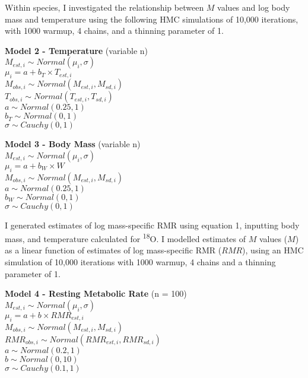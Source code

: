 \documentclass[12pt, titlepage]{article}
\begin{document}
Within species, I investigated the relationship between $M$ values and log body mass and temperature using the following HMC simulations of 10,000 iterations, with 1000 warmup, 4 chains, and a thinning parameter of 1.

\begin{center}
\textbf{Model 2 - Temperature} (variable n)
\\$M_{est, i} \sim Normal(\mu_{i}, \sigma)$
\\$\mu_{i} = a + b_{T} \times T_{est, i}$
\\$M_{obs, i} \sim Normal(M_{est, i}, M_{sd, i})$
\\$T_{obs, i} \sim Normal(T_{est, i}, T_{sd, i})$
\\$a \sim Normal(0.25, 1)$
\\$b_{T} \sim Normal (0, 1)$
\\$\sigma \sim Cauchy(0, 1)$
\end{center}

\begin{center}
\textbf{Model 3 - Body Mass} (variable n)
\\$M_{est, i} \sim Normal(\mu_{i}, \sigma)$
\\$\mu_{i} = a + b_{W} \times W$
\\$M_{obs, i} \sim Normal(M_{est, i}, M_{sd, i})$
\\$a \sim Normal(0.25, 1)$
\\$b_{W} \sim Normal (0, 1)$
\\$\sigma \sim Cauchy(0, 1)$
\end{center}

\pagebreak
I generated estimates of log mass-specific RMR using equation 1, inputting body mass, and temperature calculated for \textdelta \textsuperscript{18}O.
I modelled estimates of $M$ values ($M$) as a linear function of estimates of log mass-specific RMR ($RMR$), using an HMC simulation of 10,000 iterations with 1000 warmup, 4 chains and a thinning parameter of 1.

\begin{center}
\textbf{Model 4 - Resting Metabolic Rate} (n = 100)
\\$M_{est, i} \sim Normal(\mu_{i}, \sigma)$
\\$\mu_{i} = a + b \times RMR_{est, i}$
\\$M_{obs, i} \sim Normal(M_{est, i}, M_{sd, i})$
\\$RMR_{obs, i} \sim  Normal(RMR_{est, i}, RMR_{sd , i})$
\\$a \sim Normal(0.2, 1)$
\\$b \sim Normal(0, 10)$
\\$\sigma \sim Cauchy(0.1, 1)$
\end{center}
\end{document}
